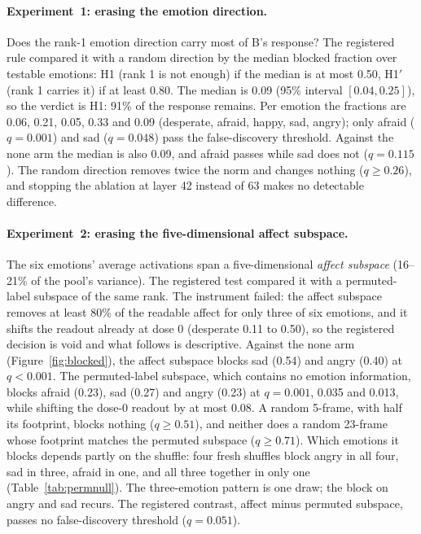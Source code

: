 \documentclass{article}
\begin{document}
\paragraph{Experiment~1: erasing the emotion direction.} Does the rank-1 emotion direction carry most of B's response? The registered rule compared it with a random direction by the median blocked fraction over testable emotions: H1 (rank 1 is not enough) if the median is at most 0.50, H1$'$ (rank 1 carries it) if at least 0.80. The median is 0.09 (95\% interval $[0.04, 0.25]$), so the verdict is H1: 91\% of the response remains. Per emotion the fractions are 0.06, 0.21, 0.05, 0.33 and 0.09 (desperate, afraid, happy, sad, angry); only afraid ($q = 0.001$) and sad ($q = 0.048$) pass the false-discovery threshold. Against the none arm the median is also 0.09, and afraid passes while sad does not ($q = 0.115$). The random direction removes twice the norm and changes nothing ($q \ge 0.26$), and stopping the ablation at layer 42 instead of 63 makes no detectable difference.

\paragraph{Experiment~2: erasing the five-dimensional affect subspace.} The six emotions' average activations span a five-dimensional \emph{affect subspace} (16--21\% of the pool's variance). The registered test compared it with a permuted-label subspace of the same rank. The instrument failed: the affect subspace removes at least 80\% of the readable affect for only three of six emotions, and it shifts the readout already at dose 0 (desperate 0.11 to 0.50), so the registered decision is void and what follows is descriptive. Against the none arm (Figure~\ref{fig:blocked}), the affect subspace blocks sad (0.54) and angry (0.40) at $q < 0.001$. The permuted-label subspace, which contains no emotion information, blocks afraid (0.23), sad (0.27) and angry (0.23) at $q = 0.001$, 0.035 and 0.013, while shifting the dose-0 readout by at most 0.08. A random 5-frame, with half its footprint, blocks nothing ($q \ge 0.51$), and neither does a random 23-frame whose footprint matches the permuted subspace ($q \ge 0.71$). Which emotions it blocks depends partly on the shuffle: four fresh shuffles block angry in all four, sad in three, afraid in one, and all three together in only one (Table~\ref{tab:permnull}). The three-emotion pattern is one draw; the block on angry and sad recurs. The registered contrast, affect minus permuted subspace, passes no false-discovery threshold ($q = 0.051$).
\end{document}
